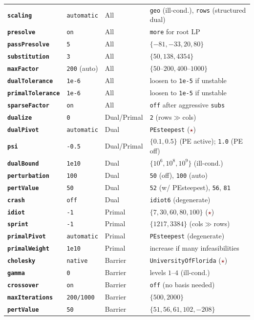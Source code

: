 \documentclass[11pt,a4paper]{article}
\newcommand{\param}[1]{\texttt{\textbf{#1}}}
\newcommand{\val}[1]{\texttt{#1}}
\newcommand{\important}{\textcolor{darkred}{\textbf{$\star$}}}
\begin{document}
\begin{longtable}{@{}P{3.5cm}P{2.5cm}P{2.2cm}P{5cm}@{}}
  \param{scaling}       & \val{automatic}  & All & \val{geo} (ill-cond.), \val{rows} (structured dual) \\
  \param{presolve}      & \val{on}          & All & \val{more} for root LP \\
  \param{passPresolve}  & \val{5}           & All & $\{-81,-33,20,80\}$ \\
  \param{substitution}  & \val{3}           & All & $\{50, 138, 4354\}$ \\
  \param{maxFactor}     & \val{200} (auto)  & All & $\{50\text{--}200, 400\text{--}1000\}$ \\
  \param{dualTolerance} & \val{1e-6}        & All & loosen to \val{1e-5} if unstable \\
  \param{primalTolerance}& \val{1e-6}       & All & loosen to \val{1e-5} if unstable \\
  \param{sparseFactor}  & \val{on}          & All & \val{off} after aggressive \val{subs} \\
  \param{dualize}       & \val{0}           & Dual/Primal & \val{2} (rows$\gg$cols) \\
  \addlinespace
  \param{dualPivot}     & \val{automatic}   & Dual & \val{PEsteepest} (\important) \\
  \param{psi}           & \val{-0.5}        & Dual/Primal & $\{0.1, 0.5\}$ (PE active); \val{1.0} (PE off) \\
  \param{dualBound}     & \val{1e10}        & Dual & $\{10^6,10^8,10^9\}$ (ill-cond.) \\
  \param{perturbation}  & \val{100}         & Dual & \val{50} (off), \val{100} (auto) \\
  \param{pertValue}     & \val{50}          & Dual & \val{52} (w/ PEsteepest), \val{56}, \val{81} \\
  \param{crash}         & \val{off}         & Dual & \val{idiot6} (degenerate) \\
  \addlinespace
  \param{idiot}         & \val{-1}          & Primal & $\{7, 30, 60, 80, 100\}$ (\important) \\
  \param{sprint}        & \val{-1}          & Primal & $\{1217, 3384\}$ (cols$\gg$rows) \\
  \param{primalPivot}   & \val{automatic}   & Primal & \val{PEsteepest} (degenerate) \\
  \param{primalWeight}  & \val{1e10}        & Primal & increase if many infeasibilities \\
  \addlinespace
  \param{cholesky}      & \val{native}      & Barrier & \val{UniversityOfFlorida} (\important) \\
  \param{gamma}         & \val{0}           & Barrier & levels $1$--$4$ (ill-cond.) \\
  \param{crossover}     & \val{on}          & Barrier & \val{off} (no basis needed) \\
  \param{maxIterations} & \val{200/1000}    & Barrier & $\{500, 2000\}$ \\
  \param{pertValue}     & \val{50}          & Barrier & $\{51,56,61,102,-208\}$ \\
\end{longtable}
\end{document}
